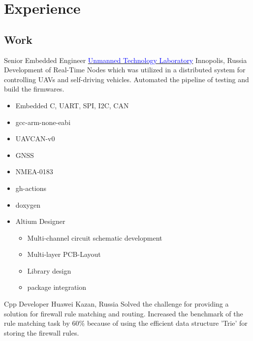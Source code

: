 \section{Experience}

\vspace{2mm}
\subsection{\Large{Work}}

        {Senior Embedded Engineer}
        {\href{https://robotics.innopolis.university/en/labs/laboratoriya-bespilotnyh-technologyi/}{\textcolor{blue}{Unmanned Technology Laboratory}}}
        {Innopolis, Russia}
        {
        \newline
        Development of Real-Time Nodes which was utilized in a distributed system for controlling UAVs and self-driving vehicles. Automated the pipeline of testing and build the firmwares.
        } 
        {
        \begin{itemize}
            \item Embedded C, UART, SPI, I2C, CAN
            \item gcc-arm-none-eabi
            \item UAVCAN-v0
            \item GNSS
                \item NMEA-0183
            \item gh-actions
            \item doxygen
            \item Altium Designer \begin{itemize}
                \item Multi-channel circuit schematic development
                \item Multi-layer PCB-Layout
                \item Library design
                \item package integration
            \end{itemize}
        \end{itemize}
        }
        {Cpp Developer}
        {Huawei}
        {Kazan, Russia}
        {
        \newline
        Solved the challenge for providing a solution for firewall rule matching and routing. 
        Increased the benchmark of the rule matching task by 60\% because of using the efficient data structure 'Trie' for storing the firewall rules. 
        }
